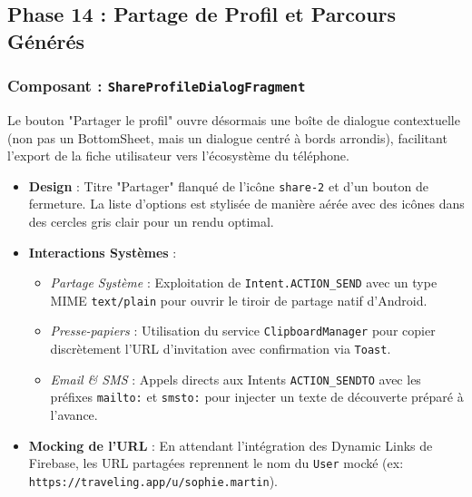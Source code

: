 \documentclass{article}
\begin{document}
\subsection{Phase 14 : Partage de Profil et Parcours Générés}

\subsubsection{Composant : \texttt{ShareProfileDialogFragment}}
Le bouton "Partager le profil" ouvre désormais une boîte de dialogue contextuelle (non pas un BottomSheet, mais un dialogue centré à bords arrondis), facilitant l'export de la fiche utilisateur vers l'écosystème du téléphone.
\begin{itemize}
    \item \textbf{Design} : Titre "Partager" flanqué de l'icône \texttt{share-2} et d'un bouton de fermeture. La liste d'options est stylisée de manière aérée avec des icônes dans des cercles gris clair pour un rendu optimal.
    \item \textbf{Interactions Systèmes} :
    \begin{itemize}
        \item \textit{Partage Système} : Exploitation de \texttt{Intent.ACTION\_SEND} avec un type MIME \texttt{text/plain} pour ouvrir le tiroir de partage natif d'Android.
        \item \textit{Presse-papiers} : Utilisation du service \texttt{ClipboardManager} pour copier discrètement l'URL d'invitation avec confirmation via \texttt{Toast}.
        \item \textit{Email \& SMS} : Appels directs aux Intents \texttt{ACTION\_SENDTO} avec les préfixes \texttt{mailto:} et \texttt{smsto:} pour injecter un texte de découverte préparé à l'avance.
    \end{itemize}
    \item \textbf{Mocking de l'URL} : En attendant l'intégration des Dynamic Links de Firebase, les URL partagées reprennent le nom du \texttt{User} mocké (ex: \texttt{https://traveling.app/u/sophie.martin}).
\end{itemize}
\end{document}
